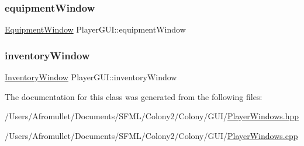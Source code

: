 \subsubsection{\texorpdfstring{equipment\+Window}{equipmentWindow}}
{\footnotesize\ttfamily \mbox{\hyperlink{class_equipment_window}{Equipment\+Window}} Player\+G\+U\+I\+::equipment\+Window\hspace{0.3cm}{\ttfamily [private]}}

\mbox{\label{class_player_g_u_i_a6fc15fd1c326ce6b11c35387500a731d}} 
\subsubsection{\texorpdfstring{inventory\+Window}{inventoryWindow}}
{\footnotesize\ttfamily \mbox{\hyperlink{class_inventory_window}{Inventory\+Window}} Player\+G\+U\+I\+::inventory\+Window\hspace{0.3cm}{\ttfamily [private]}}



The documentation for this class was generated from the following files\+:\begin{DoxyCompactItemize}
\item 
/\+Users/\+Afromullet/\+Documents/\+S\+F\+M\+L/\+Colony2/\+Colony/\+G\+U\+I/\mbox{\hyperlink{_player_windows_8hpp}{Player\+Windows.\+hpp}}\item 
/\+Users/\+Afromullet/\+Documents/\+S\+F\+M\+L/\+Colony2/\+Colony/\+G\+U\+I/\mbox{\hyperlink{_player_windows_8cpp}{Player\+Windows.\+cpp}}\end{DoxyCompactItemize}
